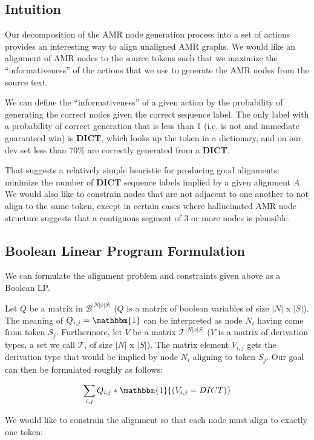 \subsection{Intuition}

Our decomposition of the AMR node generation process into a set of actions provides an interesting way to align unaligned AMR graphs. We would like an alignment of AMR nodes to the source tokens such that we maximize the ``informativeness'' of the actions that we use to generate the AMR nodes from the source text.

We can define the ``informativeness'' of a given action by the probability of generating the correct nodes given the correct sequence label. The only label with a probability of correct generation that is less than 1 (i.e. is not and immediate guaranteed win) is \textbf{DICT}, which looks up the token in a dictionary, and on our dev set less than 70\% are correctly generated from a \textbf{DICT}.

That suggests a relatively simple heuristic for producing good alignments: minimize the number of \textbf{DICT} sequence labels implied by a given alignment $A$. We would also like to constrain nodes that are not adjacent to one another to not align to the same token, except in certain cases where hallucinated AMR node structure suggests that a contiguous segment of 3 or more nodes is plausible.

\subsection{Boolean Linear Program Formulation}

We can formulate the alignment problem and constraints given above as a Boolean LP.

Let $Q$ be a matrix in $\mathcal{B}^{|N| x |S|}$ ($Q$ is a matrix of boolean variables of size $|N|$ x $|S|$). The meaning of $Q_{i,j} = \mathbbm{1}$ can be interpreted as node $N_i$ having come from token $S_j$. Furthermore, let $V$ be a matrix $\mathcal{T}^{|N| x |S|}$ ($V$ is a matrix of derivation types, a set we call $\mathcal{T}$, of size $|N|$ x $|S|$). The matrix element $V_{i,j}$ gets the derivation type that would be implied by node $N_i$ aligning to token $S_j$.  Our goal can then be formulated roughly as follows:

\[\sum_{i,j} Q_{i,j}*\mathbbm{1}{(V_{i,j} = DICT)}\]

We would like to constrain the alignment so that each node must align to exactly one token:

